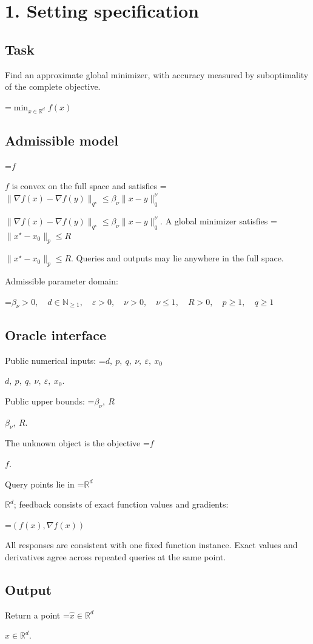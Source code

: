 \documentclass[10pt,a4paper]{article}
\newcommand{\AtlasMath}[1]{\par\begingroup\centering\setbox0=\hbox{$\displaystyle #1$}\ifdim\wd0>1.4\linewidth\typeout{ATLAS WIDE FORMULA: \the\wd0}\fi\ifdim\wd0>\linewidth\resizebox{\linewidth}{!}{\box0}\else\box0\fi\par\endgroup}
\newcommand{\AtlasInlineMath}[1]{\begingroup\setbox0=\hbox{$#1$}\ifdim\wd0>.4\linewidth\endgroup\AtlasMath{#1}\else\endgroup$#1$\fi}
\begin{document}
\section{1. Setting specification}
\subsection{Task}
Find an approximate global minimizer, with accuracy measured by suboptimality of the complete objective.


\AtlasMath{\min_{x\in \mathbb{R}^d}f(x)}


\subsection{Admissible model}
\AtlasInlineMath{f} is convex on the full space and satisfies \AtlasInlineMath{\|\nabla f(x)-\nabla f(y)\|_{q^\star}\le\beta_\nu\|x-y\|_q^\nu}. A global minimizer satisfies \AtlasInlineMath{\|x^\star-x_0\|_p\le R}. Queries and outputs may lie anywhere in the full space.

Admissible parameter domain:


\AtlasMath{\beta_\nu>0,\quad d\in\mathbb{N}_{\ge1},\quad \varepsilon>0,\quad \nu>0,\quad \nu\le1,\quad R>0,\quad p\ge1,\quad q\ge1}


\subsection{Oracle interface}
Public numerical inputs: \AtlasInlineMath{d,\ p,\ q,\ \nu,\ \varepsilon,\ x_0}.

Public upper bounds: \AtlasInlineMath{\beta_\nu,\ R}.

The unknown object is the objective \AtlasInlineMath{f}.

Query points lie in \AtlasInlineMath{\mathbb{R}^d}; feedback consists of exact function values and gradients:


\AtlasMath{(f(x),\nabla f(x))}


All responses are consistent with one fixed function instance. Exact values and derivatives agree across repeated queries at the same point.

\subsection{Output}
Return a point \AtlasInlineMath{\widehat x\in\mathbb R^d}.
\end{document}
